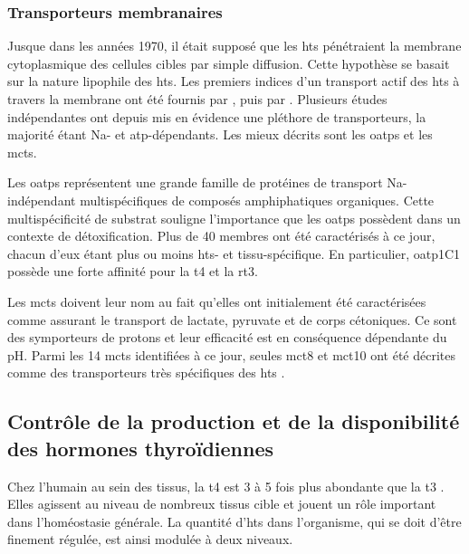 \documentclass[../main.tex]{subfiles}
\begin{document}
		\subsubsection{Transporteurs membranaires}
			Jusque dans les années 1970, il était supposé que les \glspl{ht} pénétraient la membrane cytoplasmique des cellules cibles par simple diffusion. Cette hypothèse se basait sur la nature lipophile des \glspl{ht}.
			Les premiers indices d'un transport actif des \glspl{ht} à travers la membrane ont été fournis par \citet{Christensen1954}, puis par \citet{Rao1976}. Plusieurs études indépendantes ont depuis mis en évidence une pléthore de transporteurs, la majorité étant \gls{Na}- et \gls{atp}-dépendants. Les mieux décrits sont les \glspl{oatp} et les \glspl{mct}.
			\par
			Les \glspl{oatp} représentent une grande famille de protéines de transport \gls{Na}-indépendant multispécifiques de composés amphiphatiques organiques.
			Cette multispécificité de substrat souligne l'importance que les \glspl{oatp} possèdent dans un contexte de détoxification.
			Plus de 40 membres ont été caractérisés à ce jour, chacun d'eux étant plus ou moins \glspl{ht}- et tissu-spécifique.
			En particulier, \gls{oatp}1C1 possède une forte affinité pour la \gls{t4} et la \gls{rt3}.
			\par
			Les \glspl{mct} doivent leur nom au fait qu'elles ont initialement été caractérisées comme assurant le transport de lactate, pyruvate et de corps cétoniques.
			Ce sont des symporteurs de protons et leur efficacité est en conséquence dépendante du pH.
			Parmi les 14 \glspl{mct} identifiées à ce jour, seules \gls{mct}8 et \gls{mct}10 ont été décrites comme des transporteurs très spécifiques des \glspl{ht} \citep{Friesema2003,Friesema2008}.


	\subsection{Contrôle de la production et de la disponibilité des hormones thyroïdiennes}\label{subsec:th-prod-control}
		Chez l'humain au sein des tissus, la \gls{t4} est 3 à 5 fois plus abondante que la \gls{t3} \citep{Laurberg1984}. Elles agissent au niveau de nombreux tissus cible et jouent un rôle important dans l'homéostasie générale.
		La quantité d'\glspl{ht} dans l'organisme, qui se doit d'être finement régulée, est ainsi modulée à deux niveaux.
\end{document}
